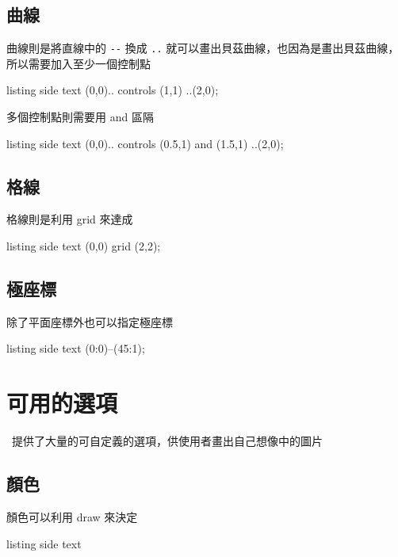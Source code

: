\subsection{曲線}

曲線則是將直線中的 \verb`--` 換成 \verb`..` 就可以畫出貝茲曲線，也因為是畫出貝茲曲線，所以需要加入至少一個控制點

\begin{tcblisting}{listing side text}
\tikz \draw (0,0).. controls (1,1) ..(2,0);
\end{tcblisting}

多個控制點則需要用 and 區隔

\begin{tcblisting}{listing side text}
\tikz \draw (0,0).. controls (0.5,1) and (1.5,1) ..(2,0);
\end{tcblisting}

\subsection{格線}

格線則是利用 grid 來達成

\begin{tcblisting}{listing side text}
\tikz \draw (0,0) grid (2,2);
\end{tcblisting}

\subsection{極座標}

除了平面座標外也可以指定極座標

\begin{tcblisting}{listing side text}
\tikz \draw (0:0)--(45:1);
\end{tcblisting}

\section{可用的選項}

\TikZ\ 提供了大量的可自定義的選項，供使用者畫出自己想像中的圖片

\subsection{顏色}

顏色可以利用 draw 來決定

\begin{tcblisting}{listing side text}
\end{tcblisting}

